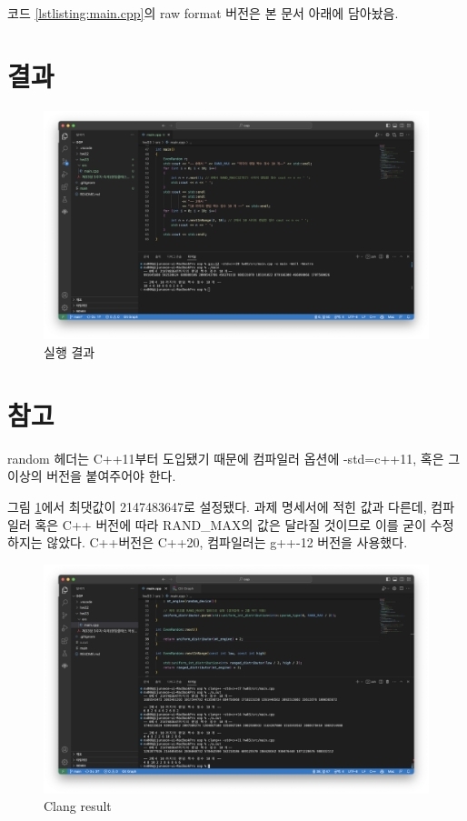 \documentclass{article}
\begin{document}
코드 \ref{lstlisting:main.cpp}의 raw format 버전은 본 문서 아래에 담아놨음.

\newpage
\section{결과}
\begin{figure}[ht]
    \centering
    \includegraphics[width=\textwidth]{random_result.png}
    \caption{실행 결과}
    \label{fig:result}
\end{figure}

\newpage
\section{참고}
random 헤더는 C++11부터 도입됐기 때문에 컴파일러 옵션에 -std=c++11, 혹은 그 이상의 버전을 붙여주어야 한다.

그림 \ref{fig:result}에서 최댓값이 2147483647로 설정됐다. 과제 명세서에 적힌 값과 다른데, 컴파일러 혹은 C++ 버전에 따라 RAND\_MAX의 값은 달라질 것이므로 이를 굳이 수정하지는 않았다.
C++버전은 C++20, 컴파일러는 g++-12 버전을 사용했다.

\begin{figure}
    \centering
    \includegraphics[width=\textwidth]{clang_result.png}
    \caption{Clang result}
    \label{fig:clang result}
\end{figure}
\end{document}
